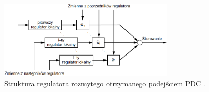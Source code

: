 \begin{figure}[h!]
\centering
\includegraphics[width=0.75\textwidth]{pictures/pdc}
\caption{Struktura regulatora rozmytego otrzymanego podejściem PDC \cite{171}.}
\label{pdc}
\end{figure}